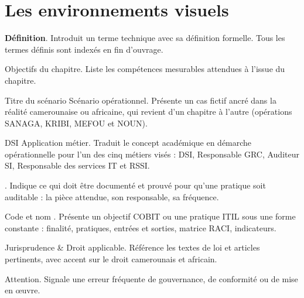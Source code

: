 \section*{Les environnements visuels}

\begin{boxdef}
\textbf{Définition}. Introduit un terme technique avec sa définition formelle.
Tous les termes définis sont indexés en fin d'ouvrage.
\end{boxdef}

\begin{boxobjectifs}
Objectifs du chapitre. Liste les compétences mesurables attendues à l'issue
du chapitre.
\end{boxobjectifs}

\begin{boxscenario}{Titre du scénario}
Scénario opérationnel. Présente un cas fictif ancré dans la réalité
camerounaise ou africaine, qui revient d'un chapitre à l'autre (opérations
SANAGA, KRIBI, MEFOU et NOUN).
\end{boxscenario}

\begin{boxmetier}{DSI}
Application métier. Traduit le concept académique en démarche
opérationnelle pour l'un des cinq métiers visés : DSI, Responsable GRC,
Auditeur SI, Responsable des services IT et RSSI.
\end{boxmetier}

\begin{boxprocedure}
\libelleProcedure. Indique ce qui doit être documenté et prouvé pour qu'une
pratique soit auditable : la pièce attendue, son responsable, sa fréquence.
\end{boxprocedure}

\begin{boxobjet}{Code et nom}
\libelleObjet. Présente un objectif COBIT ou une pratique ITIL sous une forme
constante : finalité, pratiques, entrées et sorties, matrice RACI,
indicateurs.
\end{boxobjet}

\begin{boxjuris}
Jurisprudence \& Droit applicable. Référence les textes de loi et articles
pertinents, avec accent sur le droit camerounais et africain.
\end{boxjuris}

\begin{boxalert}
Attention. Signale une erreur fréquente de gouvernance, de conformité ou de
mise en œuvre.
\end{boxalert}

